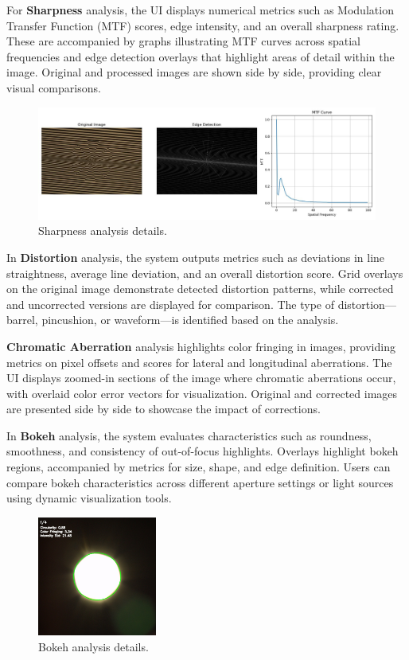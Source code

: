 For \textbf{Sharpness} analysis, the UI displays numerical metrics such as Modulation Transfer Function (MTF) scores, edge intensity, and an overall sharpness rating. These are accompanied by graphs illustrating MTF curves across spatial frequencies and edge detection overlays that highlight areas of detail within the image. Original and processed images are shown side by side, providing clear visual comparisons.

\begin{figure}[h]
\centering
\includegraphics[width=1\textwidth]{Images/sharpness_image_result.jpg}
\caption{Sharpness analysis details.}
\label{fig:ui_sharpness_image}
\end{figure}

In \textbf{Distortion} analysis, the system outputs metrics such as deviations in line straightness, average line deviation, and an overall distortion score. Grid overlays on the original image demonstrate detected distortion patterns, while corrected and uncorrected versions are displayed for comparison. The type of distortion—barrel, pincushion, or waveform—is identified based on the analysis.

\textbf{Chromatic Aberration} analysis highlights color fringing in images, providing metrics on pixel offsets and scores for lateral and longitudinal aberrations. The UI displays zoomed-in sections of the image where chromatic aberrations occur, with overlaid color error vectors for visualization. Original and corrected images are presented side by side to showcase the impact of corrections.

In \textbf{Bokeh} analysis, the system evaluates characteristics such as roundness, smoothness, and consistency of out-of-focus highlights. Overlays highlight bokeh regions, accompanied by metrics for size, shape, and edge definition. Users can compare bokeh characteristics across different aperture settings or light sources using dynamic visualization tools.

\begin{figure}[h]
\centering
\includegraphics[width=0.35\textwidth]{Images/bokeh_image_result.jpg}
\caption{Bokeh analysis details.}
\label{fig:ui_bokeh_image}
\end{figure}

